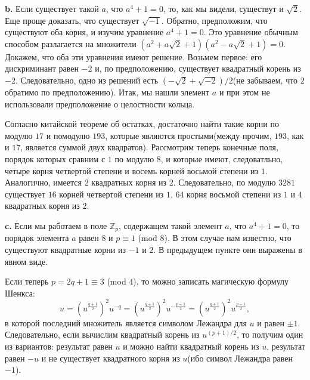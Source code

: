 \documentclass{mai_book}
\begin{document}
\textbf{b. } Если существует такой $a$, что $a^{4} + 1 = 0$, то, как мы видели, существут и $\sqrt{2}$. Еще проще доказать, что существует $\sqrt{-1}$. Обратно, предположим, что существуют оба корня, и изучим уравнение $a^{4}+1 = 0$. Это уравнение обычным способом разлагается на множители $(a^{2}+a\sqrt{2}+1)(a^{2}-a\sqrt{2}+1) = 0$. Докажем, что оба эти уравнения имеют решение. Возьмем первое: его дискриминант равен $-2$ и, по предположению, существует квадратный корень из $-2$. Следовательно, одно из решений есть $(-\sqrt{2}+\sqrt{-2})/2$(не забываем, что $2$ обратимо по предположению). Итак, мы нашли элемент $a$ и при этом не использовали предположение о целостности кольца. \par
Согласно китайской теореме об остатках, достаточно найти такие корни по модулю $17$ и помодулю $193$, которые являются простыми(между прочим, $193$, как и $17$, является суммой двух квадратов). Рассмотрим теперь конечные поля, порядок которых сравним с $1$ по модулю $8$, и которые имеют, следоватльно, четыре корня четвертой степени и восемь корней восьмой степени из $1$. Аналогично, имеется $2$ квадратных корня из $2$. Следовательно, по модулю $3281$ существует $16$ корней четвертой степени из $1$, $64$ корня восьмой степени из $1$ и $4$ квадратных корня из $2$. \smallskip

\textbf{c. } Если мы работаем в поле $\mathbb{Z}_{p}$, содержащем такой элемент $a$, что $a^{4}+1=0$, то порядок элемента $a$ равен $8$ и $p \equiv 1$ (mod $8$). В этом случае нам известно, что существуют квадратные корни из $-1$ и $2$. В предыдущем пункте они выражены в явном виде. \par
Если теперь $p = 2q+1 \equiv 3$ (mod $4$), то можно записать магическую формулу Шенкса:
\begin{equation*}
	u = \left(u^{\frac{q+1}{2}}\right)^{2}u^{-q} = \left(u^{\frac{q+1}{2}}\right)^{2}u^{-\frac{p-1}{2}} = \left(u^{\frac{q+1}{2}}\right)^{2}u^{\frac{p-1}{2}},
\end{equation*}
в которой последний множитель является символом Лежандра для $u$ и равен $\pm 1$. Следовательно, если вычислим квадратный корень из $u^{(p+1)/2}$, то получим один из вариантов: результат равен $u$ и можно найти квадратный корень из $u$, результат равен $-u$ и не существует квадратного корня из $u$(ибо символ Лежандра равен $-1$).\\

 \\
\end{document}
